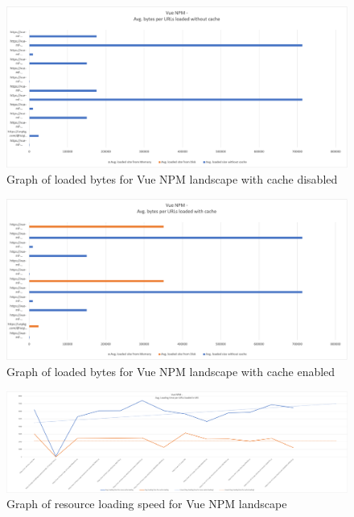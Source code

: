 \newpage
\begin{figure}[!h]
	\centering
	\includegraphics[width=1.4\textwidth, angle=90]{Figures/vue_npm_bytes.png}
	\caption{Graph of loaded bytes for Vue NPM landscape with cache disabled}
	\label{fig:appendix_1_13}
\end{figure}
\newpage
\begin{figure}[!h]
	\centering
	\includegraphics[width=1.4\textwidth, angle=90]{Figures/vue_npm_bytes_cache.png}
	\caption{Graph of loaded bytes for Vue NPM landscape with cache enabled}
	\label{fig:appendix_1_14}
\end{figure}
\newpage
\begin{figure}[!h]
	\centering
	\includegraphics[width=1.4\textwidth, angle=90]{Figures/vue_npm_speed.png}
	\caption{Graph of resource loading speed for Vue NPM landscape}
	\label{fig:appendix_1_15}
\end{figure}
\newpage

